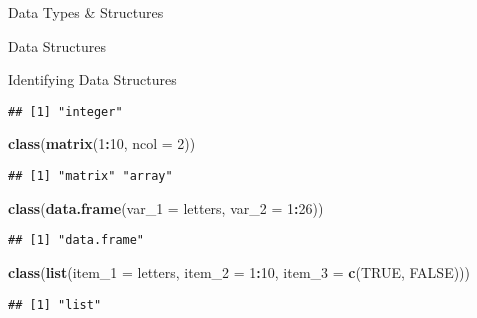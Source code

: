 \documentclass[
  ignorenonframetext,
]{beamer}
\newenvironment{Shaded}{\begin{snugshade}}{\end{snugshade}}
\newcommand{\AttributeTok}[1]{\textcolor[rgb]{0.13,0.29,0.53}{#1}}
\newcommand{\ConstantTok}[1]{\textcolor[rgb]{0.56,0.35,0.01}{#1}}
\newcommand{\DecValTok}[1]{\textcolor[rgb]{0.00,0.00,0.81}{#1}}
\newcommand{\FunctionTok}[1]{\textcolor[rgb]{0.13,0.29,0.53}{\textbf{#1}}}
\newcommand{\NormalTok}[1]{#1}
\newcommand{\SpecialCharTok}[1]{\textcolor[rgb]{0.81,0.36,0.00}{\textbf{#1}}}
\begin{document}
\begin{frame}[fragile]{Data Types \& Structures}
\begin{block}{Data Structures}
\begin{block}{Identifying Data Structures}
\begin{verbatim}
## [1] "integer"
\end{verbatim}

\begin{Shaded}
\begin{Highlighting}[]
\FunctionTok{class}\NormalTok{(}\FunctionTok{matrix}\NormalTok{(}\DecValTok{1}\SpecialCharTok{:}\DecValTok{10}\NormalTok{, }\AttributeTok{ncol =} \DecValTok{2}\NormalTok{))}
\end{Highlighting}
\end{Shaded}

\begin{verbatim}
## [1] "matrix" "array"
\end{verbatim}

\begin{Shaded}
\begin{Highlighting}[]
\FunctionTok{class}\NormalTok{(}\FunctionTok{data.frame}\NormalTok{(}\AttributeTok{var\_1 =}\NormalTok{ letters,}
           \AttributeTok{var\_2 =} \DecValTok{1}\SpecialCharTok{:}\DecValTok{26}\NormalTok{))}
\end{Highlighting}
\end{Shaded}

\begin{verbatim}
## [1] "data.frame"
\end{verbatim}

\begin{Shaded}
\begin{Highlighting}[]
\FunctionTok{class}\NormalTok{(}\FunctionTok{list}\NormalTok{(}\AttributeTok{item\_1 =}\NormalTok{ letters,}
     \AttributeTok{item\_2 =} \DecValTok{1}\SpecialCharTok{:}\DecValTok{10}\NormalTok{,}
     \AttributeTok{item\_3 =} \FunctionTok{c}\NormalTok{(}\ConstantTok{TRUE}\NormalTok{, }\ConstantTok{FALSE}\NormalTok{)))}
\end{Highlighting}
\end{Shaded}

\begin{verbatim}
## [1] "list"
\end{verbatim}
\end{block}
\end{block}
\end{frame}
\end{document}
